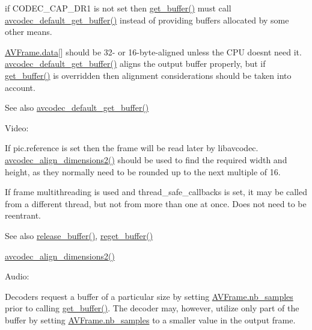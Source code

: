 if C\+O\+D\+E\+C\+\_\+\+C\+A\+P\+\_\+\+D\+R1 is not set then \hyperlink{struct_a_v_codec_context_abc3a806b73306162efa218510448d54f}{get\+\_\+buffer()} must call \hyperlink{group__lavc__decoding_ga666e4cc55f8a14c3b1ea66aaef2f6970}{avcodec\+\_\+default\+\_\+get\+\_\+buffer()} instead of providing buffers allocated by some other means.

\hyperlink{struct_a_v_frame_a1d0f65014a8d1bf78cec8cbed2304992}{A\+V\+Frame.\+data}\mbox{[}\mbox{]} should be 32-\/ or 16-\/byte-\/aligned unless the C\+PU doesn\textquotesingle{}t need it. \hyperlink{group__lavc__decoding_ga666e4cc55f8a14c3b1ea66aaef2f6970}{avcodec\+\_\+default\+\_\+get\+\_\+buffer()} aligns the output buffer properly, but if \hyperlink{struct_a_v_codec_context_abc3a806b73306162efa218510448d54f}{get\+\_\+buffer()} is overridden then alignment considerations should be taken into account.

\begin{DoxySeeAlso}{See also}
\hyperlink{group__lavc__decoding_ga666e4cc55f8a14c3b1ea66aaef2f6970}{avcodec\+\_\+default\+\_\+get\+\_\+buffer()}
\end{DoxySeeAlso}
Video\+:

If pic.\+reference is set then the frame will be read later by libavcodec. \hyperlink{group__lavc__decoding_ga34e3269dc1b9e2c98e9371241722e7e2}{avcodec\+\_\+align\+\_\+dimensions2()} should be used to find the required width and height, as they normally need to be rounded up to the next multiple of 16.

If frame multithreading is used and thread\+\_\+safe\+\_\+callbacks is set, it may be called from a different thread, but not from more than one at once. Does not need to be reentrant.

\begin{DoxySeeAlso}{See also}
\hyperlink{struct_a_v_codec_context_ac934a388c7779e800c13914ff00b6916}{release\+\_\+buffer()}, \hyperlink{struct_a_v_codec_context_ac568dd88fe0dab777fe35641d955f44d}{reget\+\_\+buffer()} 

\hyperlink{group__lavc__decoding_ga34e3269dc1b9e2c98e9371241722e7e2}{avcodec\+\_\+align\+\_\+dimensions2()}
\end{DoxySeeAlso}
Audio\+:

Decoders request a buffer of a particular size by setting \hyperlink{struct_a_v_frame_a02f45ab8191aea1660159f1e464237ea}{A\+V\+Frame.\+nb\+\_\+samples} prior to calling \hyperlink{struct_a_v_codec_context_abc3a806b73306162efa218510448d54f}{get\+\_\+buffer()}. The decoder may, however, utilize only part of the buffer by setting \hyperlink{struct_a_v_frame_a02f45ab8191aea1660159f1e464237ea}{A\+V\+Frame.\+nb\+\_\+samples} to a smaller value in the output frame.

